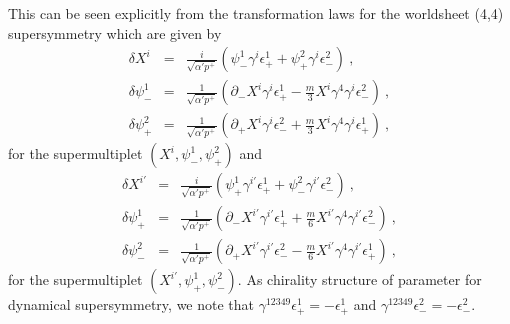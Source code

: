 \documentclass[a4paper,12pt]{article}
\begin{document}
This can be seen explicitly from the transformation laws \cite{hyu074} 
for the worldsheet (4,4) supersymmetry which are given by
\begin{eqnarray}
\delta X^i &=& \frac{i}{\sqrt{\alpha' p^+}} (
                \psi^1_- \gamma^i \epsilon^1_+  +
                \psi^2_+ \gamma^i \epsilon^2_-)~,   
                                             \nonumber \\
\delta \psi^1_- &=&
  \frac{1}{\sqrt{\alpha' p^+}} 
    \left( \partial_- X^i \gamma^i \epsilon^1_+
        - \frac{m}{3} X^i \gamma^4 \gamma^i 
          \epsilon^2_- 
    \right) ~,
                                                \nonumber \\
\delta \psi^2_+ &=&
  \frac{1}{\sqrt{\alpha' p^+}} 
    \left( \partial_+ X^i \gamma^i \epsilon^2_-
        + \frac{m}{3} X^i \gamma^4 \gamma^i 
           \epsilon^1_+ 
    \right)~,
\label{dynst1}
\end{eqnarray}
for the supermultiplet $(X^i, \psi^1_-, \psi^2_+)$ and
\begin{eqnarray}
\delta X^{i'} &=& \frac{i}{\sqrt{\alpha' p^+}} (
                \psi^1_+ \gamma^{i'} \epsilon^1_+ + 
                \psi^2_- \gamma^{i'} \epsilon^2_- )~,   
                                             \nonumber \\
\delta \psi^1_+ &=&
  \frac{1}{\sqrt{\alpha' p^+}} 
    \left( 
      \partial_- X^{i'} \gamma^{i'} \epsilon^1_+
      +\frac{m}{6} X^{i'} \gamma^4 \gamma^{i'} 
       \epsilon^2_-
    \right) ~,
                                                \nonumber \\
\delta \psi^2_- &=&
  \frac{1}{\sqrt{\alpha' p^+}} 
    \left( \partial_+ X^{i'} \gamma^{i'} \epsilon^2_-
       - \frac{m}{6} X^{i'} \gamma^4 \gamma^{i'}
       \epsilon^1_+ 
    \right) ~,
\label{dynst2}
\end{eqnarray}
for the supermultiplet $(X^{i'}, \psi^1_+, \psi^2_-)$.  As chirality
structure of parameter for dynamical supersymmetry, we note that
$\gamma^{12349} \epsilon^1_+ = - \epsilon^1_+$ and $\gamma^{12349}
\epsilon^2_- = -\epsilon^2_-$.
\end{document}
